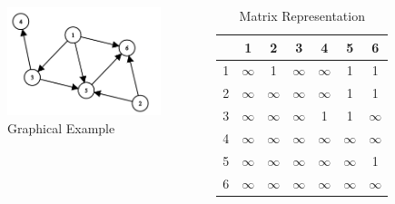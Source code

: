 \documentclass{beamer}
\begin{document}
\begin{frame}
	\begin{columns}
	\begin{figure}
		\includegraphics[scale=0.5]{./pict/exampleGraph.png}
		\caption{Graphical Example}
	\end{figure}

	\begin{table}
		\begin{tabular}{c|c|c|c|c|c|c}
			  & 1 & 2 & 3 & 4 & 5 & 6\\
			  \hline
			1 & $\infty$ & 1 & $\infty$ & $\infty$ & 1 & 1\\
			\hline
			2 & $\infty$ & $\infty$ & $\infty$ & $\infty$ & 1 & 1\\ 
			\hline
			3 & $\infty$ & $\infty$ & $\infty$ & 1 & 1 & $\infty$ \\
			\hline
			4 & $\infty$ & $\infty$ & $\infty$ & $\infty$ & $\infty$ & $\infty$  \\
			\hline
			5 &  $\infty$ & $\infty$ & $\infty$ & $\infty$ & $\infty$ & 1\\
			\hline
			6 & $\infty$ & $\infty$ & $\infty$ & $\infty$ & $\infty$ & $\infty$\\
			\hline
		\end{tabular}
		\caption{Matrix Representation}
	\end{table}
	\end{columns}
\end{frame}
\end{document}

